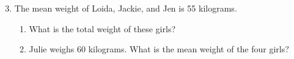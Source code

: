 \begin{enumerate}[label = \arabic*. ]
\setcounter{enumi}{2}
\item The mean weight of Loida, Jackie, and Jen is 55 kilograms.
\begin{enumerate}[label = \alph*. ]
\item What is the total weight of these girls?
\item Julie weighs 60 kilograms. What is the mean weight of the four girls?

\end{enumerate}  
\end{enumerate}   
